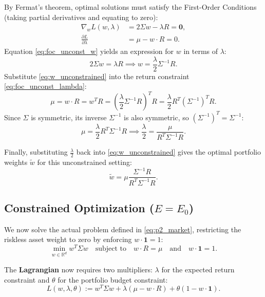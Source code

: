 By Fermat's theorem, optimal solutions must satisfy the First-Order Conditions (taking partial derivatives and equating to zero):
\begin{align}
    \nabla_w L(w, \lambda) &= 2\Sigma w - \lambda R = \mathbf{0}, \label{eq:foc_unconst_w} \\
    \frac{\partial L}{\partial \lambda} &= \mu - w \cdot R = 0. \label{eq:foc_unconst_lambda}
\end{align}
Equation \eqref{eq:foc_unconst_w} yields an expression for $w$ in terms of $\lambda$:
\begin{equation}
    2\Sigma w = \lambda R \implies w = \frac{\lambda}{2} \Sigma^{-1} R. \label{eq:w_unconstrained}
\end{equation}
Substitute \eqref{eq:w_unconstrained} into the return constraint \eqref{eq:foc_unconst_lambda}:
\begin{equation*}
    \mu = w \cdot R = w^T R = \left( \frac{\lambda}{2} \Sigma^{-1} R \right)^T R = \frac{\lambda}{2} R^T (\Sigma^{-1})^T R.
\end{equation*}
Since $\Sigma$ is symmetric, its inverse $\Sigma^{-1}$ is also symmetric, so $(\Sigma^{-1})^T = \Sigma^{-1}$:
\begin{equation}
    \mu = \frac{\lambda}{2} R^T \Sigma^{-1} R \implies \frac{\lambda}{2} = \frac{\mu}{R^T \Sigma^{-1} R}.
\end{equation}

Finally, substituting $\frac{\lambda}{2}$ back into \eqref{eq:w_unconstrained} gives the optimal portfolio weights $\tilde{w}$ for this unconstrained setting:
\begin{equation}
    \tilde{w} = \mu \frac{\Sigma^{-1} R}{R^T \Sigma^{-1} R}.
\end{equation}

\subsection{Constrained Optimization ($E = E_0$)}
We now solve the actual problem defined in \eqref{eq:p2_market}, restricting the riskless asset weight to zero by enforcing $w \cdot \mathbf{1} = 1$:
\begin{equation}
    \min_{w \in \mathbb{R}^d} w^T \Sigma w \quad \text{subject to} \quad w \cdot R = \mu \quad \text{and} \quad w \cdot \mathbf{1} = 1.
\end{equation}

The \textbf{Lagrangian} now requires two multipliers: $\lambda$ for the expected return constraint and $\theta$ for the portfolio budget constraint:
\begin{equation}
    L(w, \lambda, \theta) := w^T \Sigma w + \lambda(\mu - w \cdot R) + \theta(1 - w \cdot \mathbf{1}).
\end{equation}

